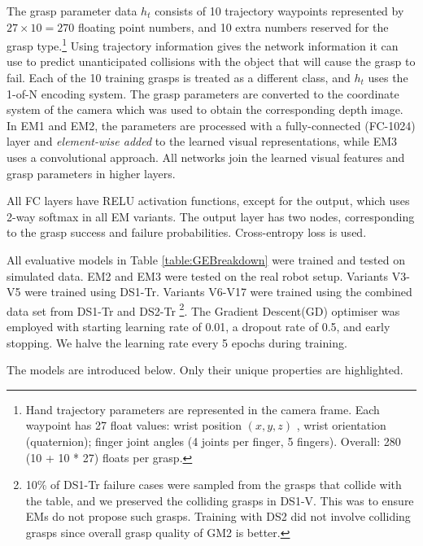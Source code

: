 The grasp parameter data $h_t$ consists of 10 trajectory waypoints represented by $27 \times 10 = 270$ floating point numbers, and 10 extra numbers reserved for the grasp type.\footnote{Hand trajectory parameters are represented in the camera frame. Each waypoint has 27 float values: wrist position $(x,y,z)$ , wrist orientation (quaternion); finger joint angles (4 joints per finger, 5 fingers). Overall: 280 (10 + 10 * 27) floats per grasp.} Using trajectory information gives the network information it can use to predict unanticipated collisions with the object that will cause the grasp to fail. Each of the 10 training grasps is treated as a different class, and $h_t$ uses the 1-of-N encoding system. The grasp parameters are converted to the coordinate system of the camera which was used to obtain the corresponding depth image. In EM1 and EM2, the parameters are processed with a fully-connected (FC-1024) layer and \textit{element-wise added} to the learned visual representations, while EM3 uses a convolutional approach. All networks join the learned visual features and grasp parameters in higher layers.

All FC layers have RELU activation functions, except for the output, which uses 2-way softmax in all EM variants. The output layer has two nodes, corresponding to the grasp success and failure probabilities. Cross-entropy loss is used. %

All evaluative models in Table \ref{table:GEBreakdown} were trained and tested on simulated data. EM2 and EM3 were tested on the real robot setup. Variants V3-V5 were trained using DS1-Tr. Variants V6-V17 were trained using the combined data set from DS1-Tr and DS2-Tr \footnote{10\% of DS1-Tr failure cases were sampled from the grasps that collide with the table, and we preserved the colliding grasps in DS1-V. This was to ensure EMs do not propose such grasps. Training with DS2 did not involve colliding grasps since overall grasp quality of GM2 is better.}. The Gradient Descent(GD) optimiser was employed with starting learning rate of 0.01, a dropout rate of 0.5, and early stopping. We halve the learning rate every 5 epochs during training.


The models are introduced below. Only their unique properties are highlighted.

